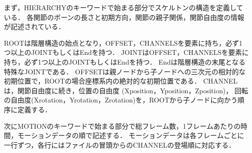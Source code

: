 \documentclass[a4j, fleqn, 12pt]{jsreport}
\begin{document}
まず，HIERARCHYのキーワードで始まる部分でスケルトンの構造を定義している．
各関節のボーンの長さと初期方向，関節の親子関係，関節自由度の情報が記述されている．

ROOTは階層構造の始点となり，OFFSET，CHANNELSを要素に持ち，必ず1つ以上のJOINTもしくはEndを持つ．
JOINTはOFFSET，CHANNELSを要素に持ち，必ず1つ以上のJOINTもしくはEndを持つ．
Endは階層構造の末尾となる特殊なJOINTである．
OFFSETは親ノードから子ノードへの三次元の相対的な初期位置で，ROOTの場合座標系内の絶対的な初期位置である．
CHANNELは，関節自由度に続き，位置の自由度 (Xposition，Yposition，Zposition)，
回転の自由度(Xrotation，Yrotation，Zrotation)を，ROOTから子ノードに向かう順序に定義する．

次にMOTIONのキーワードで始まる部分で総フレーム数，1フレームあたりの時間，モーションデータの順で記述する．
モーションデータは各フレームごとに一行ずつ，各行にはファイルの冒頭からのCHANNELの登場順に対応する．
\end{document}
